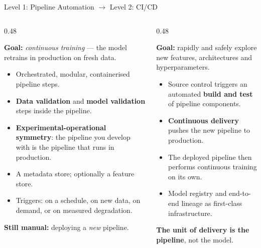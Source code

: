 \begin{frame}{Level 1: Pipeline Automation $\rightarrow$ Level 2: CI/CD}

    \begin{columns}[T]
        \begin{column}{0.48\textwidth}
            \begin{tcolorbox}[colback=orange!6, colframe=orange!60!black, title=\scriptsize Level 1: ML pipeline automation]
                \tiny
                \textbf{Goal:} \emph{continuous training} --- the model retrains in production on fresh data.
                \begin{itemize}
                    \item Orchestrated, modular, containerised pipeline steps.
                    \item \textbf{Data validation} and \textbf{model validation} steps inside the pipeline.
                    \item \textbf{Experimental-operational symmetry}: the pipeline you develop with is the
                          pipeline that runs in production.
                    \item A metadata store; optionally a feature store.
                    \item Triggers: on a schedule, on new data, on demand, or on measured degradation.
                \end{itemize}
                \textbf{Still manual:} deploying a \emph{new} pipeline.
            \end{tcolorbox}
        \end{column}
        \begin{column}{0.48\textwidth}
            \begin{tcolorbox}[colback=green!6, colframe=green!50!black, title=\scriptsize Level 2: CI/CD pipeline automation]
                \tiny
                \textbf{Goal:} rapidly and safely explore new features, architectures and hyperparameters.
                \begin{itemize}
                    \item Source control triggers an automated \textbf{build and test} of pipeline components.
                    \item \textbf{Continuous delivery} pushes the new pipeline to production.
                    \item The deployed pipeline then performs continuous training on its own.
                    \item Model registry and end-to-end lineage as first-class infrastructure.
                \end{itemize}
                \textbf{The unit of delivery is the pipeline}, not the model.
            \end{tcolorbox}
        \end{column}
    \end{columns}


\end{frame}
